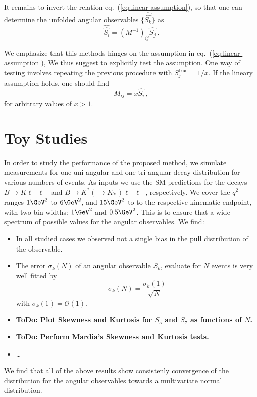 \documentclass[aps,prd,reprint,nofootinbib,preprintnumbers]{revtex4}
\newcommand{\refeq}[1]{eq.~(\ref{eq:#1})}
\newcommand{\order}[1]{\mathcal{O}\left({#1}\right)}
\newcommand{\est}[1]{\widehat{#1}}
\newcommand{\wwhat}[1]{\widehat{\widehat{#1}}}
\newcommand{\todo}[1]{{\color{red}\bf ToDo: #1}}
\begin{document}
It remains to invert the relation \refeq{linear-assumption}, so that one can determine the unfolded
angular observables $\lbrace \wwhat{S_k}\rbrace$ as
\begin{equation}
    \wwhat{S_i} = \left(M^{-1}\right)_{ij} \est{S_j}\,.
\end{equation}

We emphasize that this methods hinges on the assumption in \refeq{linear-assumption}, We thus suggest to explicitly
test the assumption. One way of testing involves repeating the previous procedure
with $S_j^\text{true} = 1/x$. If the lineary assumption holds, one should find
\begin{equation}
    M_{ij} = x \est{S_i}\,,
\end{equation}
for arbitrary values of $x > 1$.


\section{Toy Studies}
\label{sec:numerics}

In order to study the performance of the proposed method, we simulate measurements for one uni-angular
and one tri-angular decay distribution for various numbers of events. As inputs we use the SM predictions
for the decays $B\to K\ell^+\ell^-$ and $B\to K^*(\to K\pi)\ell^+\ell^-$, respectively. We cover the
$q^2$ ranges $1\GeV^2$ to $6\GeV^2$, and $15\GeV^2$ to to the respective kinematic endpoint, with two
bin widths: $1\GeV^2$ and $0.5\GeV^2$. This is to ensure that a wide spectrum of possible values for
the angular observables. We find:
\begin{itemize}
    \item In all studied cases we observed not a single bias in the pull distribution of the observable.
    \item The error $\sigma_k(N)$ of an angular observable $S_k$, evaluate for $N$ events is very well
        fitted by
        \begin{equation}
            \sigma_k(N) = \frac{\sigma_k(1)}{\sqrt{N}}
        \end{equation}
        with $\sigma_k(1) = \order{1}$. 
    \item \todo{Plot Skewness and Kurtosis for $S_5$ and $S_7$ as functions of $N$.}
    \item \todo{Perform Mardia's Skewness and Kurtosis tests.}
    \item \dots
\end{itemize}
We find that all of the above results show consistenly convergence of the distribution for the angular observables
towards a multivariate normal distribution.
\end{document}
